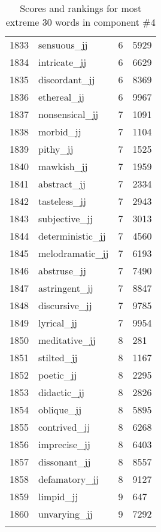 \begin{longtable}[!htbp]{| rlr@{.}l |}
    1833 & sensuous\_jj & 6 & 5929 \\
    1834 & intricate\_jj & 6 & 6629 \\
    1835 & discordant\_jj & 6 & 8369 \\
    1836 & ethereal\_jj & 6 & 9967 \\
    1837 & nonsensical\_jj & 7 & 1091 \\
    1838 & morbid\_jj & 7 & 1104 \\
    1839 & pithy\_jj & 7 & 1525 \\
    1840 & mawkish\_jj & 7 & 1959 \\
    1841 & abstract\_jj & 7 & 2334 \\
    1842 & tasteless\_jj & 7 & 2943 \\
    1843 & subjective\_jj & 7 & 3013 \\
    1844 & deterministic\_jj & 7 & 4560 \\
    1845 & melodramatic\_jj & 7 & 6193 \\
    1846 & abstruse\_jj & 7 & 7490 \\
    1847 & astringent\_jj & 7 & 8847 \\
    1848 & discursive\_jj & 7 & 9785 \\
    1849 & lyrical\_jj & 7 & 9954 \\
    1850 & meditative\_jj & 8 & 281 \\
    1851 & stilted\_jj & 8 & 1167 \\
    1852 & poetic\_jj & 8 & 2295 \\
    1853 & didactic\_jj & 8 & 2826 \\
    1854 & oblique\_jj & 8 & 5895 \\
    1855 & contrived\_jj & 8 & 6268 \\
    1856 & imprecise\_jj & 8 & 6403 \\
    1857 & dissonant\_jj & 8 & 8557 \\
    1858 & defamatory\_jj & 8 & 9127 \\
    1859 & limpid\_jj & 9 & 647 \\
    1860 & unvarying\_jj & 9 & 7292 \\
    \hline
    \caption{Scores and rankings for most extreme 30 words in component \#4} \\
\end{longtable}
